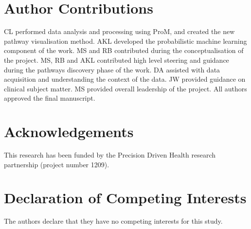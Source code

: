 \documentclass{elsarticle}
\begin{document}
\linenumbers



\section*{Author Contributions}
CL performed data analysis and processing using ProM, and created the new pathway visualisation method.
AKL developed the probabilistic machine learning component of the work.
MS and RB contributed during the conceptualisation of the project. MS, RB and AKL contributed  high level steering and guidance during the pathways discovery phase of the work.
DA assisted with data acquisition and understanding the context of the data.
JW provided guidance on clinical subject matter.
MS provided overall leadership of the project.
All authors approved the final manuscript.

\section*{Acknowledgements}
This research has been funded by the Precision Driven Health research partnership (project number 1209).

\section*{Declaration of Competing Interests}
The authors declare that they have no competing interests for this study.

%

\begin{appendix}

\end{appendix}
\end{document}
